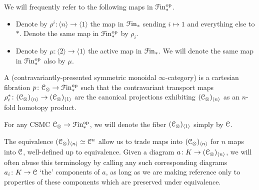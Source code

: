 \documentclass[main.tex]{subfiles}
\begin{document}
\begin{notation}
  We will frequently refer to the following maps in $\mathcal{F}\mathrm{in}_{*}^{\mathrm{op}}$.
  \begin{itemize}
    \item Denote by $\rho^{i}\colon \langle n \rangle \to \langle 1 \rangle$ the map in $\mathcal{F}\mathrm{in}_{*}$ sending $i \mapsto 1$ and everything else to $\ast$. Denote the same map in $\mathcal{F}\mathrm{in}_{*}^{\mathrm{op}}$ by $\rho_{i}$.

    \item Denote by $\mu\colon \langle 2 \rangle \to \langle 1 \rangle$ the active map in $\mathcal{F}\mathrm{in}_{*}$. We will denote the same map in $\mathcal{F}\mathrm{in}_{*}^{\mathrm{op}}$ also by $\mu$.
  \end{itemize}
\end{notation}

\begin{definition}
  A  (contravariantly-presented symmetric monoidal $\infty$-category) is a cartesian fibration $p\colon \mathcal{C}_{\otimes} \to \mathcal{F}\mathrm{in}_{*}^{\mathrm{op}}$ such that the contravariant transport maps $\rho_{i}^{*}\colon (\mathcal{C}_{ \otimes})_{\langle n \rangle} \to (\mathcal{C}_{ \otimes})_{\langle 1 \rangle}$ are the canonical projections exhibiting $(\mathcal{C}_{ \otimes})_{\langle n \rangle}$ as an $n$-fold homotopy product.
\end{definition}

\begin{notation}
  For any CSMC $\mathcal{C}_{\otimes} \to \mathcal{F}\mathrm{in}_{*}^{\mathrm{op}}$, we will denote the fiber $(\mathcal{C}_{\otimes})_{\langle 1 \rangle}$ simply by $\mathcal{C}$.
\end{notation}

The equivalence $(\mathcal{C}_{\otimes})_{\langle n \rangle} \simeq \mathcal{C}^{n}$ allow us to trade maps into $(\mathcal{C}_{\otimes})_{\langle n \rangle}$ for $n$ maps into $\mathcal{C}$, well-defined up to equivalence. Given a diagram $a\colon K \to (\mathcal{C}_{\otimes})_{\langle n \rangle}$, we will often abuse this terminology by calling any such corresponding diagrams $a_{i}\colon K \to \mathcal{C}$ `the' components of $a$, as long as we are making reference only to properties of these components which are preserved under equivalence.
\end{document}
